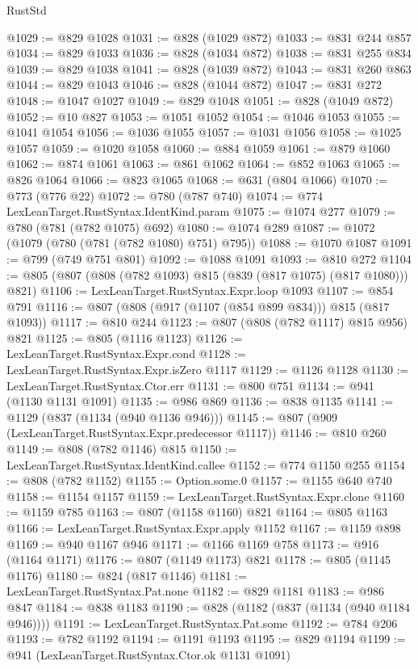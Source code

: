 \begin{lexlean}{RustStd}
\begin{coremodule}
@1029 := @829 @1028
@1031 := @828 (@1029 @872)
@1033 := @831 @244 @857
@1034 := @829 @1033
@1036 := @828 (@1034 @872)
@1038 := @831 @255 @834
@1039 := @829 @1038
@1041 := @828 (@1039 @872)
@1043 := @831 @260 @863
@1044 := @829 @1043
@1046 := @828 (@1044 @872)
@1047 := @831 @272
@1048 := @1047 @1027
@1049 := @829 @1048
@1051 := @828 (@1049 @872)
@1052 := @10 @827
@1053 := @1051 @1052
@1054 := @1046 @1053
@1055 := @1041 @1054
@1056 := @1036 @1055
@1057 := @1031 @1056
@1058 := @1025 @1057
@1059 := @1020 @1058
@1060 := @884 @1059
@1061 := @879 @1060
@1062 := @874 @1061
@1063 := @861 @1062
@1064 := @852 @1063
@1065 := @826 @1064
@1066 := @823 @1065
@1068 := @631 (@804 @1066)
@1070 := @773 (@776 @22)
@1072 := @780 (@787 @740)
@1074 := @774 LexLeanTarget.RustSyntax.IdentKind.param
@1075 := @1074 @277
@1079 := @780 (@781 (@782 @1075) @692)
@1080 := @1074 @289
@1087 := @1072 (@1079 (@780 (@781 (@782 @1080) @751) @795))
@1088 := @1070 @1087
@1091 := @799 (@749 @751 @801)
@1092 := @1088 @1091
@1093 := @810 @272
@1104 := @805 (@807 (@808 (@782 @1093) @815 (@839 (@817 @1075) (@817 @1080))) @821)
@1106 := LexLeanTarget.RustSyntax.Expr.loop @1093
@1107 := @854 @791
@1116 := @807 (@808 (@917 (@1107 (@854 @899 @834))) @815 (@817 @1093))
@1117 := @810 @244
@1123 := @807 (@808 (@782 @1117) @815 @956) @821
@1125 := @805 (@1116 @1123)
@1126 := LexLeanTarget.RustSyntax.Expr.cond
@1128 := LexLeanTarget.RustSyntax.Expr.isZero @1117
@1129 := @1126 @1128
@1130 := LexLeanTarget.RustSyntax.Ctor.err
@1131 := @800 @751
@1134 := @941 (@1130 @1131 @1091)
@1135 := @986 @869
@1136 := @838 @1135
@1141 := @1129 (@837 (@1134 (@940 @1136 @946)))
@1145 := @807 (@909 (LexLeanTarget.RustSyntax.Expr.predecessor @1117))
@1146 := @810 @260
@1149 := @808 (@782 @1146) @815
@1150 := LexLeanTarget.RustSyntax.IdentKind.callee
@1152 := @774 @1150 @255
@1154 := @808 (@782 @1152)
@1155 := Option.some.{0}
@1157 := @1155 @640 @740
@1158 := @1154 @1157
@1159 := LexLeanTarget.RustSyntax.Expr.clone
@1160 := @1159 @785
@1163 := @807 (@1158 @1160) @821
@1164 := @805 @1163
@1166 := LexLeanTarget.RustSyntax.Expr.apply @1152
@1167 := @1159 @898
@1169 := @940 @1167 @946
@1171 := @1166 @1169 @758
@1173 := @916 (@1164 @1171)
@1176 := @807 (@1149 @1173) @821
@1178 := @805 (@1145 @1176)
@1180 := @824 (@817 @1146)
@1181 := LexLeanTarget.RustSyntax.Pat.none
@1182 := @829 @1181
@1183 := @986 @847
@1184 := @838 @1183
@1190 := @828 (@1182 (@837 (@1134 (@940 @1184 @946))))
@1191 := LexLeanTarget.RustSyntax.Pat.some
@1192 := @784 @206
@1193 := @782 @1192
@1194 := @1191 @1193
@1195 := @829 @1194
@1199 := @941 (LexLeanTarget.RustSyntax.Ctor.ok @1131 @1091)

\end{coremodule}
\end{lexlean}
